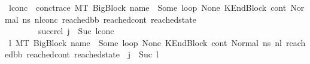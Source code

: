 \begin{isabellebody}
\ l{}{\isacharunderscore}{\kern0pt}conc\ \ conc{\isacharunderscore}{\kern0pt}trace{\isacharcolon}{\kern0pt}\ {\isachardoublequoteopen}{\isacharparenleft}{\kern0pt}M{\isacharcomma}{\kern0pt}{\isasymLambda}{\isacharcomma}{\kern0pt}{\isasymGamma}{\isacharcomma}{\kern0pt}{\isasymOmega}{\isacharcomma}{\kern0pt}T\ {\isasymturnstile}{\isacharparenleft}{\kern0pt}BigBlock\ name\ {\isacharbrackleft}{\kern0pt}{\isacharbrackright}{\kern0pt}\ {\isacharparenleft}{\kern0pt}Some\ loop{\isacharparenright}{\kern0pt}\ None{\isacharcomma}{\kern0pt}\ KEndBlock\ cont{}{\isacharcomma}{\kern0pt}\ Normal\ ns{}{\isacharprime}{\kern0pt}{\isacharprime}{\kern0pt}{\isacharparenright}{\kern0pt}\ {\isacharminus}{\kern0pt}n{\isasymlongrightarrow}{\isacharcircum}{\kern0pt}l{}{\isacharunderscore}{\kern0pt}conc\ {\isacharparenleft}{\kern0pt}reached{\isacharunderscore}{\kern0pt}bb{\isacharcomma}{\kern0pt}\ reached{\isacharunderscore}{\kern0pt}cont{\isacharcomma}{\kern0pt}\ reached{\isacharunderscore}{\kern0pt}state{\isacharparenright}{\kern0pt}{\isacharparenright}{\kern0pt}{\isachardoublequoteclose}\ \ \isanewline
\ \ \ \ \ \ \ \ succ{\isacharunderscore}{\kern0pt}rel{\isacharcolon}{\kern0pt}\ {\isachardoublequoteopen}{\isacharparenleft}{\kern0pt}j\ {\isacharequal}{\kern0pt}\ Suc\ l{}{\isacharunderscore}{\kern0pt}conc{\isacharparenright}{\kern0pt}{\isachardoublequoteclose}\isanewline
\ \ \ \ \ \ \ \ \isamarkupfalse%
\ {\isacartoucheopen}{\isasymexists}l{}{\isachardot}{\kern0pt}\ {\isacharparenleft}{\kern0pt}M{\isacharcomma}{\kern0pt}{\isasymLambda}{\isacharcomma}{\kern0pt}{\isasymGamma}{\isacharcomma}{\kern0pt}{\isasymOmega}{\isacharcomma}{\kern0pt}T\ {\isasymturnstile}{\isacharparenleft}{\kern0pt}BigBlock\ name\ {\isacharbrackleft}{\kern0pt}{\isacharbrackright}{\kern0pt}\ {\isacharparenleft}{\kern0pt}Some\ loop{\isacharparenright}{\kern0pt}\ None{\isacharcomma}{\kern0pt}\ KEndBlock\ cont{}{\isacharcomma}{\kern0pt}\ Normal\ ns{}{\isacharprime}{\kern0pt}{\isacharprime}{\kern0pt}{\isacharparenright}{\kern0pt}\ {\isacharminus}{\kern0pt}n{\isasymlongrightarrow}{\isacharcircum}{\kern0pt}l{}\ {\isacharparenleft}{\kern0pt}reached{\isacharunderscore}{\kern0pt}bb{\isacharcomma}{\kern0pt}\ reached{\isacharunderscore}{\kern0pt}cont{\isacharcomma}{\kern0pt}\ reached{\isacharunderscore}{\kern0pt}state{\isacharparenright}{\kern0pt}{\isacharparenright}{\kern0pt}\ {\isasymand}\ j\ {\isacharequal}{\kern0pt}\ Suc\ l{}{\isacartoucheclose}\ \isamarkupfalse%

\end{isabellebody}
